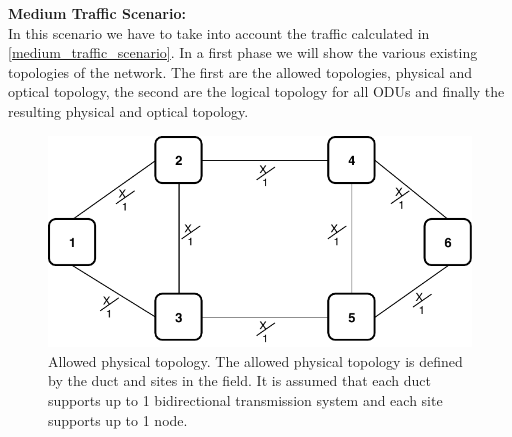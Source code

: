\newpage
\textbf{Medium Traffic Scenario:}\\

In this scenario we have to take into account the traffic calculated in \ref{medium_traffic_scenario}. In a first
phase we will show the various existing topologies of the network. The first are the allowed topologies, physical and optical topology, the second are the logical topology for all ODUs and finally the resulting physical and optical topology. \\

\begin{figure}[h!]
\centering
\includegraphics[width=12cm]{sdf/ilp/opaque_survivability/figures/allowed_physical_topology}
\caption{Allowed physical topology. The allowed physical topology is defined by the duct and sites in the field. It is assumed that each duct supports up to 1 bidirectional transmission system and each site supports up to 1 node.}
\label{allowed_physical_medium}
\end{figure}

